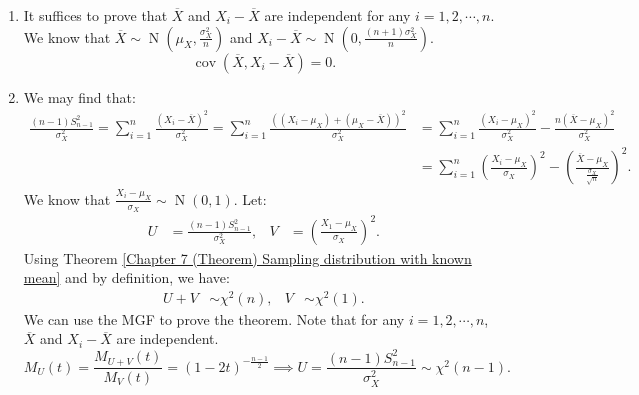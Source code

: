 \documentclass{huhtakm-template-book-v2}
\DeclareMathOperator{\N}{N}
\DeclareMathOperator{\cov}{cov}
\begin{document}
    \begin{proofing}
        \begin{enumerate}
            \item It suffices to prove that $\overline{X}$ and $X_{i}-\overline{X}$ are independent for any $i = 1,2,\cdots,n$.\\
            We know that $\overline{X} \sim \N(\mu_{X},\frac{\sigma_{X}^{2}}{n})$ and $X_{i}-\overline{X} \sim \N(0,\frac{(n+1)\sigma_{X}^{2}}{n})$.
            \begin{equation*}
                \cov(\overline{X},X_{i}-\overline{X}) = 0.
            \end{equation*}
            \item We may find that:
            \begin{align*}
                \frac{(n-1)S_{n-1}^{2}}{\sigma_{X}^{2}} = \sum_{i = 1}^{n}\frac{(X_{i}-\overline{X})^{2}}{\sigma_{X}^{2}} = \sum_{i = 1}^{n}\frac{((X_{i}-\mu_{X})+(\mu_{X}-\overline{X}))^{2}}{\sigma_{X}^{2}} &= \sum_{i = 1}^{n}\frac{(X_{i}-\mu_{X})^{2}}{\sigma_{X}^{2}}-\frac{n(\overline{X}-\mu_{X})^{2}}{\sigma_{X}^{2}}\\
                &= \sum_{i = 1}^{n}\left(\frac{X_{i}-\mu_{X}}{\sigma_{X}}\right)^{2}-\left(\frac{\overline{X}-\mu_{X}}{\frac{\sigma_{X}}{\sqrt{n}}}\right)^{2}.
            \end{align*}
            We know that $\frac{X_{i}-\mu_{X}}{\sigma_{X}} \sim \N(0,1)$. 
            Let:
            \begin{align*}
                U &= \frac{(n-1)S_{n-1}^{2}}{\sigma_{X}^{2}}, & V &= \left(\frac{X_{1}-\mu_{X}}{\sigma_{X}}\right)^{2}.
            \end{align*}
            Using Theorem \ref{Chapter 7 (Theorem) Sampling distribution with known mean} and by definition, we have:
            \begin{align*}
                U+V &\sim \chi^{2}(n), & V &\sim \chi^{2}(1).
            \end{align*} 
            We can use the MGF to prove the theorem. Note that for any $i = 1,2,\cdots,n$, $\overline{X}$ and $X_{i}-\overline{X}$ are independent.
            \begin{equation*}
                M_{U}(t) = \frac{M_{U+V}(t)}{M_{V}(t)} = (1-2t)^{-\frac{n-1}{2}} \implies U = \frac{(n-1)S_{n-1}^{2}}{\sigma_{X}^{2}} \sim \chi^{2}(n-1).
            \end{equation*}
        \end{enumerate}
    \end{proofing}
\end{document}
